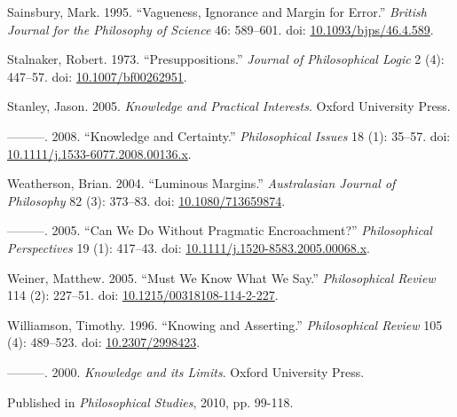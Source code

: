 \documentclass[
  10pt,
  letterpaper,
  DIV=11,
  numbers=noendperiod,
  twoside]{scrartcl}
\newlength{\cslhangindent}
\newenvironment{CSLReferences}[2] %
 {\begin{list}{}{%
  \setlength{\itemindent}{0pt}
  \setlength{\leftmargin}{0pt}
  \setlength{\parsep}{0pt}
  \ifodd #1
   \setlength{\leftmargin}{\cslhangindent}
   \setlength{\itemindent}{-1\cslhangindent}
  \fi
  \setlength{\itemsep}{#2\baselineskip}}}
 {\end{list}}
\begin{document}
\begin{CSLReferences}{1}{0}
Sainsbury, Mark. 1995. {``Vagueness, Ignorance and Margin for Error.''}
\emph{British Journal for the Philosophy of Science} 46: 589--601. doi:
\href{https://doi.org/10.1093/bjps/46.4.589}{10.1093/bjps/46.4.589}.

Stalnaker, Robert. 1973. {``{Presuppositions}.''} \emph{Journal of
Philosophical Logic} 2 (4): 447--57. doi:
\href{https://doi.org/10.1007/bf00262951}{10.1007/bf00262951}.

Stanley, Jason. 2005. \emph{{Knowledge and Practical Interests}}. Oxford
University Press.

---------. 2008. {``{Knowledge and Certainty}.''} \emph{Philosophical
Issues} 18 (1): 35--57. doi:
\href{https://doi.org/10.1111/j.1533-6077.2008.00136.x}{10.1111/j.1533-6077.2008.00136.x}.

Weatherson, Brian. 2004. {``Luminous Margins.''} \emph{Australasian
Journal of Philosophy} 82 (3): 373--83. doi:
\href{https://doi.org/10.1080/713659874}{10.1080/713659874}.

---------. 2005. {``{Can We Do Without Pragmatic Encroachment?}''}
\emph{Philosophical Perspectives} 19 (1): 417--43. doi:
\href{https://doi.org/10.1111/j.1520-8583.2005.00068.x}{10.1111/j.1520-8583.2005.00068.x}.

Weiner, Matthew. 2005. {``Must We Know What We Say.''}
\emph{Philosophical Review} 114 (2): 227--51. doi:
\href{https://doi.org/10.1215/00318108-114-2-227}{10.1215/00318108-114-2-227}.

Williamson, Timothy. 1996. {``{Knowing and Asserting}.''}
\emph{Philosophical Review} 105 (4): 489--523. doi:
\href{https://doi.org/10.2307/2998423}{10.2307/2998423}.

---------. 2000. \emph{{Knowledge and its Limits}}. Oxford University
Press.

\end{CSLReferences}



\noindent Published in\emph{
Philosophical Studies}, 2010, pp. 99-118.
\end{document}
